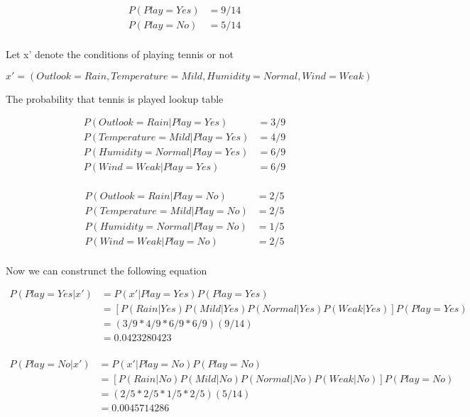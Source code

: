 \documentclass{report}
\begin{document}
\begin{equation*}
  \begin{split}
    P(Play=Yes) & = 9/14 \\
    P(Play=No)  & = 5/14 \\
  \end{split}
\end{equation*}

Let x' denote the conditions of playing tennis or not

$x' = (Outlook=Rain, Temperature=Mild, Humidity=Normal, Wind=Weak)$

The probability that tennis is played lookup table

\begin{equation*}
  \begin{split}
    P(Outlook=Rain|Play=Yes)     & = 3/9 \\
    P(Temperature=Mild|Play=Yes) & = 4/9 \\
    P(Humidity=Normal|Play=Yes)  & = 6/9 \\
    P(Wind=Weak|Play=Yes)        & = 6/9 \\
  \end{split}
\end{equation*}

\begin{equation*}
  \begin{split}
    P(Outlook=Rain|Play=No)     & = 2/5 \\
    P(Temperature=Mild|Play=No) & = 2/5 \\
    P(Humidity=Normal|Play=No)  & = 1/5 \\
    P(Wind=Weak|Play=No)        & = 2/5 \\
  \end{split}
\end{equation*}

Now we can construnct the following equation

\begin{equation*}
  \begin{split}
    P(Play=Yes|x') & = P(x'|Play=Yes)P(Play=Yes) \\
    & = [P(Rain|Yes)P(Mild|Yes)P(Normal|Yes)P(Weak|Yes)]P(Play=Yes) \\
    & = (3/9 * 4/9 * 6/9 * 6/9)(9/14) \\
    & = 0.0423280423 \\
  \end{split}
\end{equation*}

\begin{equation*}
  \begin{split}
    P(Play=No|x')  & = P(x'|Play=No)P(Play=No) \\
    & = [P(Rain|No)P(Mild|No)P(Normal|No)P(Weak|No)]P(Play=No) \\
    & = (2/5 * 2/5 * 1/5 * 2/5)(5/14) \\
    & = 0.0045714286 \\
  \end{split}
\end{equation*}
\end{document}
